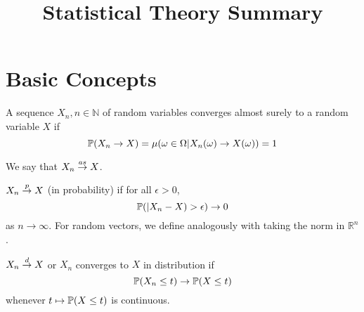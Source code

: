 

\title{Statistical Theory Summary}



\maketitle

\section{Basic Concepts}

\begin{defn}
  A sequence $X_{n}, n \in \mathbb{N}$ of random variables converges
  almost surely to a random variable $X$ if
  \begin{equation}
    \label{eq:4}
    \Prob{X_{n} \rightarrow X} = \mu(\omega \in \Omega | X_{n}(\omega)
    \rightarrow X(\omega)) = 1
  \end{equation}

  We say that $X_{n} \overset{as}{\rightarrow} X$.
\end{defn}

\begin{defn}
  $X_{n} \overset{p}{\rightarrow} X$ (in probability) if for all $\epsilon > 0$,
  \begin{equation}
    \label{eq:5}
    \Prob{|X_{n} - X} > \epsilon) \rightarrow 0
  \end{equation} as $n \rightarrow \infty$.
  For random vectors, we define analogously with taking the norm in
  $\mathbb{R}^{n}$.
\end{defn}

\begin{defn}
  $X_{n} \overset{d}{\rightarrow} X$ or $X_{n}$ converges to $X$ in distribution if
  \begin{equation}
    \label{eq:6}
    \Prob{X_{n} \leq t} \rightarrow \Prob{X \leq t}
  \end{equation} whenever $t \mapsto \Prob{X \leq t}$ is continuous.
\end{defn}

